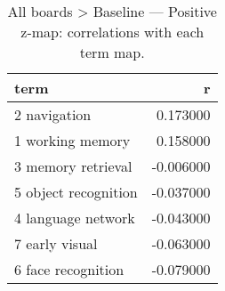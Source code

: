 \begin{table}
\caption{All boards > Baseline — Positive z-map: correlations with each term map.}
\label{tab:All boards > Baseline_pos}
\begin{tabular}{lr}
\toprule
term & r \\
\midrule
2 navigation & 0.173000 \\
1 working memory & 0.158000 \\
3 memory retrieval & -0.006000 \\
5 object recognition & -0.037000 \\
4 language network & -0.043000 \\
7 early visual & -0.063000 \\
6 face recognition & -0.079000 \\
\bottomrule
\end{tabular}
\end{table}
